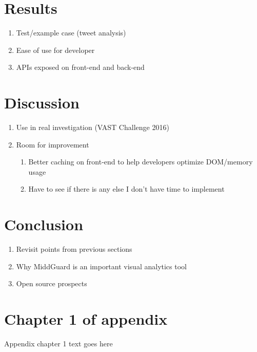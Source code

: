 \documentclass[midd]{thesis}
\begin{document}
\chapter{Results}
  \begin{enumerate}
    \item Test/example case (tweet analysis)
    \item Ease of use for developer
    \item APIs exposed on front-end and back-end
  \end{enumerate}

\chapter{Discussion}
  \begin{enumerate}
    \item Use in real investigation (VAST Challenge 2016)
    \item Room for improvement
    \begin{enumerate}
      \item Better caching on front-end to help developers optimize DOM/memory
      usage
      \item Have to see if there is any else I don't have time to implement
    \end{enumerate}
  \end{enumerate}

\chapter{Conclusion}
  \begin{enumerate}
    \item Revisit points from previous sections
    \item Why MiddGuard is an important visual analytics tool
    \item Open source prospects
  \end{enumerate}

\appendix
\chapter{Chapter 1 of appendix}
Appendix chapter 1 text goes here


\end{document}
